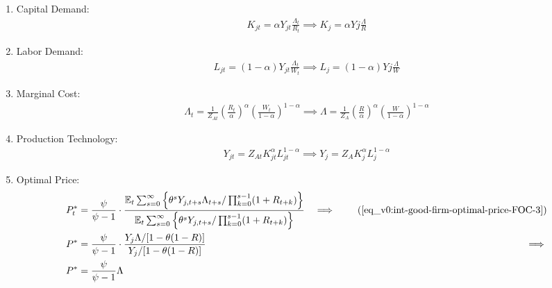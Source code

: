 \documentclass[../thesis.tex]{subfiles}
\begin{document}
\begin{enumerate}
		\item Capital Demand:
		\begin{align}
			\label{eq_v0:ss-int-good-firm-FOC-Kt}
			K_{jt} = \alpha Y_{jt} \frac{\Lambda_t}{R_t} \implies 
			K_{j} = \alpha Y{j} \frac{\Lambda}{R}
		\end{align}
		
		\item Labor Demand:
		\begin{align}
			\label{eq_v0:ss-int-good-firm-FOC-Lt}
			L_{jt} = (1-\alpha) Y_{jt} \frac{\Lambda_t}{W_t} \implies 
			L_{j} = (1-\alpha) Y{j} \frac{\Lambda}{W}
		\end{align}
		
		
		\item Marginal Cost:
		\begin{align}
			\label{eq_v0:ss-int-good-firm-MC-2}
			\Lambda_t = \frac{1}{Z_{At}} \left( \frac{R_t}{\alpha} \right)^{\alpha} \left( \frac{W_t}{1-\alpha} \right)^{1-\alpha} \implies
			\Lambda = \frac{1}{Z_{A}} \left( \frac{R}{\alpha} \right)^{\alpha} \left( \frac{W}{1-\alpha} \right)^{1-\alpha}
		\end{align}
		
		\item Production Technology:
		\begin{align}
			\label{eq_v0:ss-int-good-firm-production-function}
			Y_{jt} = Z_{At} K_{jt}^\alpha L_{jt}^{1-\alpha} \implies 
			Y_{j} = Z_{A} K_{j}^\alpha L_{j}^{1-\alpha}
		\end{align}
		
		\item Optimal Price:
		\begin{alignat}{2}
			P_t^\ast &= \frac{\psi}{\psi-1} \cdot \frac{\E \sum_{s=0}^{\infty} \left\{\theta^s Y_{j,t+s} \Lambda_{t+s} / \prod_{k=0}^{s-1}(1+R_{t+k}) \right\}} {\E \sum_{s=0}^{\infty} \left\{ \theta^s Y_{j,t+s} / \prod_{k=0}^{s-1}(1+R_{t+k}) \right\}} &\implies \tag{\ref{eq_v0:int-good-firm-optimal-price-FOC-3}} \\
			P^\ast &= \frac{\psi}{\psi-1} \cdot \frac{ Y_j \Lambda / [1-\theta(1-R)]} {Y_j / [1-\theta(1-R)]} &\implies \nonumber \\
			P^\ast &= \frac{\psi}{\psi-1} \Lambda \label{eq_v0:ss-int-good-firm-optimal-price-FOC-3}
		\end{alignat}
		

\end{enumerate}
\end{document}
